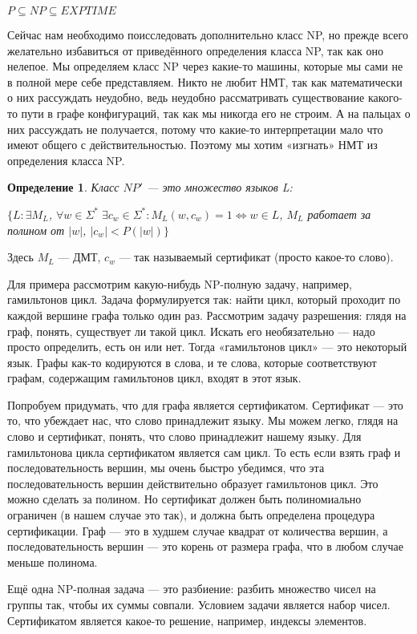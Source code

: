 \documentclass[a4paper]{article}
\newtheorem{definition}{Определение}
\begin{document}
{$P \subseteq NP \subseteq EXPTIME$

Сейчас нам необходимо поисследовать дополнительно класс NP, но прежде всего желательно избавиться от приведённого определения класса NP, так как оно нелепое. Мы определяем класс NP через какие-то машины, которые мы сами не в полной мере себе представляем. Никто не любит НМТ, так как математически о них рассуждать неудобно, ведь неудобно рассматривать существование какого-то пути в графе конфигураций, так как мы никогда его не строим. А на пальцах о них рассуждать не получается, потому что какие-то интерпретации мало что имеют общего с действительностью. Поэтому мы хотим «изгнать» НМТ из определения класса NP.

\begin{definition} Класс $NP'$ — это множество языков L: 

$\{L: \exists M_L$, $\forall w \in {\Sigma}^*\;\exists c_w \in {\Sigma}^*:M_L(w, c_w) = 1 \Leftrightarrow w \in L$, $M_L$ работает за полином от $|w|$, $|c_w|<P(|w|)\}$
\end{definition}
Здесь $M_L$ — ДМТ, $c_w$ — так называемый сертификат (просто какое-то слово).

Для примера рассмотрим какую-нибудь NP-полную задачу, например, гамильтонов цикл. Задача формулируется так: найти цикл, который проходит по каждой вершине графа только один раз. Рассмотрим задачу разрешения: глядя на граф, понять, существует ли такой цикл. Искать его необязательно — надо просто определить, есть он или нет. Тогда «гамильтонов цикл» — это некоторый язык. Графы как-то кодируются в слова, и те слова, которые соответствуют графам, содержащим гамильтонов цикл, входят в этот язык. 

Попробуем придумать, что для графа является сертификатом. Сертификат — это то, что убеждает нас, что слово принадлежит языку. Мы можем легко, глядя на слово и сертификат, понять, что слово принадлежит нашему языку. Для гамильтонова цикла сертификатом является сам цикл. То есть если взять граф и последовательность вершин, мы очень быстро убедимся, что эта последовательность вершин действительно образует гамильтонов цикл. Это можно сделать за полином. Но сертификат должен быть полиномиально ограничен (в нашем случае это так), и должна быть определена процедура сертификации. Граф — это в худшем случае квадрат от количества вершин, а последовательность вершин — это корень от размера графа, что в любом случае меньше полинома.

Ещё одна NP-полная задача — это разбиение: разбить множество чисел на группы так, чтобы их суммы совпали. Условием задачи является набор чисел. Сертификатом является какое-то решение, например, индексы элементов.

}
\end{document}
